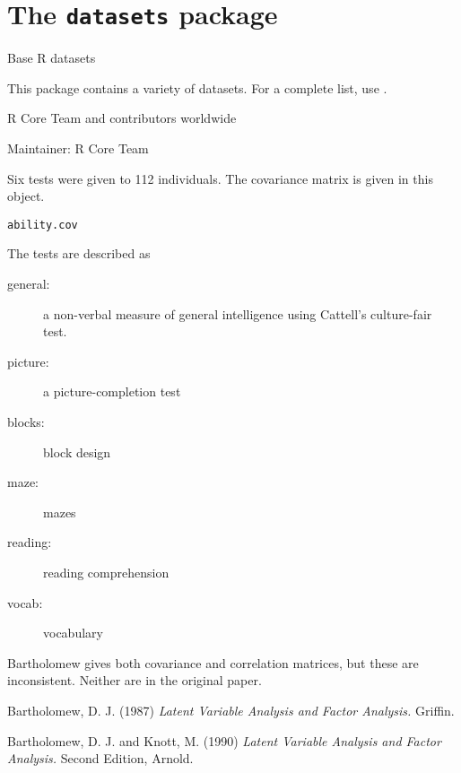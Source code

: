 
\chapter{The \texttt{datasets} package}
%
\begin{Description}\relax
Base R datasets
\end{Description}
%
\begin{Details}\relax
This package contains a variety of datasets.  For a complete
list, use .
\end{Details}
%
\begin{Author}\relax
R Core Team and contributors worldwide

Maintainer: R Core Team 
\end{Author}
%
\begin{Description}\relax
Six tests were given to 112 individuals. The covariance matrix is
given in this object.
\end{Description}
%
\begin{Usage}
\begin{verbatim}
ability.cov
\end{verbatim}
\end{Usage}
%
\begin{Details}\relax
The tests are described as
\begin{description}

\item[general:] a non-verbal measure of general intelligence using
Cattell's culture-fair test.
\item[picture:] a picture-completion test
\item[blocks:] block design
\item[maze:] mazes
\item[reading:] reading comprehension
\item[vocab:] vocabulary

\end{description}


Bartholomew gives both covariance and correlation matrices,
but these are inconsistent.  Neither are in the original paper.
\end{Details}
%
\begin{Source}\relax
Bartholomew, D. J. (1987) \emph{Latent Variable Analysis and Factor
Analysis.} Griffin.  

Bartholomew, D. J.  and Knott, M. (1990) \emph{Latent Variable Analysis
and Factor Analysis.} Second Edition, Arnold.  
\end{Source}
